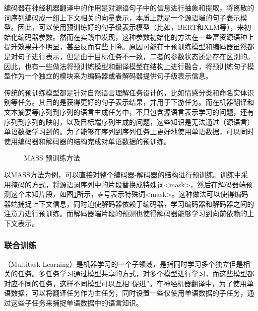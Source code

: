 
\parinterval 编码器在神经机器翻译中的作用是对源语句子中的信息进行抽象和提取，将离散的词序列编码成一组上下文相关的向量表示，本质上就是一个源语端的句子表示模型。因此，可以使用预训练好的句子级表示模型（比如，BERT和XLM等），来初始化编码器参数。然而在实践中发现，这种参数初始化的方法在一些富资源语种上提升效果并不明显，甚至反而有些下降\cite{DBLP:journals/corr/abs-2002-06823}。原因可能在于预训练模型和编码器虽然都是对句子进行表示，但是由于目标任务不一致，二者的参数状态还是存在区别的。因此，也有一些做法将预训练模型和翻译模型在结构上进行融合，将预训练句子模型作为一个独立的模块来为编码器或者解码器提供句子级表示信息\cite{DBLP:journals/corr/abs-2002-06823}。


\parinterval 传统的预训练模型都是针对自然语言理解任务设计的，比如情感分类和命名实体识别等任务。其目的是获得更好的句子表示结果，并用于下游任务。而在机器翻译和文本摘要等序列到序列的语言生成任务中，不只包含源语言表示学习的问题，还有序列到序列的映射，以及目标端序列生成的问题，这些知识是无法通过（源语言）单语数据学习到的。为了能够在序列到序列任务上更好地使用单语数据，可以同时使用编码器和解码器的结构完成对单语数据的预训练。

\begin{figure}[htp]
\centering

\caption{MASS 预训练方法}
\label{fig:7-39}
\end{figure}

\parinterval 以MASS方法为例\cite{song2019mass}，可以直接对整个编码器-解码器的结构进行预训练。训练中采用掩码的方式，将源语词序列中的片段替换成特殊词<mask>，然后在解码器端预测这个未知片段，如图\ref{fig:7-39}所示，\#号表示特殊词<mask>。这种做法可以使得编码器端捕捉上下文信息，同时迫使解码器依赖于编码器，学习编码器和解码器之间的注意力进行预训练。而解码器端片段的预测也使得解码器能够学习到向前依赖的上下文表示。


\subsubsection{联合训练}

（Multitask Learning）是机器学习的一个子领域，是指同时学习多个独立但是相关的任务\cite{DBLP:journals/corr/Ruder17a}。多任务学习通过模型共享的方式，对多个模型进行学习，而这些模型都对应不同的任务，这样不同模型可以互相``促进''。在神经机器翻译中，为了使用单语数据，可以将翻译任务作为主任务，同时设置一些仅使用单语数据的子任务，通过这些子任务来捕捉单语数据中的语言知识\cite{DBLP:conf/emnlp/DomhanH17}。


